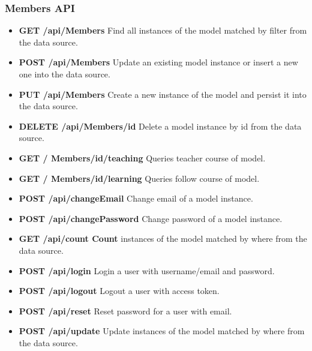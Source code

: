 \subsubsection{ Members API}
\begin{itemize}
\item \textbf{GET /api/Members} Find all instances of the model matched by filter from  the  data source.
\item \textbf{POST /api/Members} Update an existing model instance or insert a new one into the data  source.
\item \textbf{PUT /api/Members} Create a new instance of the model and persist it into the data source.
\item \textbf{DELETE /api/Members/id} Delete a model instance by id from the data source.
\item \textbf{GET / Members/id/teaching} {\color{red}Queries teacher course of model.}

\item \textbf{GET / Members/id/learning} {\color{red} Queries follow course of model.}

\item \textbf{POST /api/changeEmail} Change email of a model instance.
\item \textbf{POST /api/changePassword} Change password of a model instance.
\item \textbf{GET /api/count Count} instances of the model matched by where from the  data source.
\item \textbf{POST /api/login} Login a user with username/email and password.
\item \textbf{POST /api/logout} Logout a user with access   token.
\item \textbf{POST /api/reset} Reset password for a user with email.
\item \textbf{POST /api/update} Update instances of the model matched by where from the data source.
\end{itemize}

